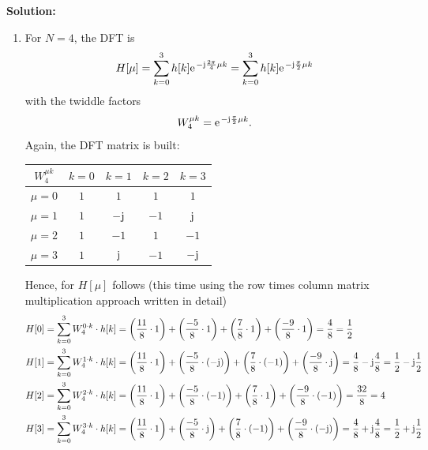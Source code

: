 \documentclass[11pt,a4paper,DIV=12]{scrartcl}
\begin{document}
\begin{Loesung}
\textbf{Solution:}
\begin{enumerate}[label=\alph*)]
	\item For $N=4$, the DFT is
	\begin{equation}
	H[\mu]=\sum_{k=0}^{3}h[k]\e^{-\im\frac{2\pi}{4}\mu k}=\sum_{k=0}^{3}h[k]\e^{-\im\frac{\pi}{2}\mu k}\nonumber
	\end{equation}
	with the twiddle factors
	\begin{equation}
	W_4^{\mu k}=\e^{-\im\frac{\pi}{2}\mu k}\nonumber.
	\end{equation}
	Again, the DFT matrix is built:
	\begin{center}
		\begin{tabular}{|c|c|c|c|c|}
		\hline
		$W_4^{\mu k}$ & $k=0$ & $k=1$ & $k=2$ & $k=3$\\\hline
		$\mu=0$ & $1$ & $1$ & $1$ & $1$\\\hline
		$\mu=1$ & $1$ & $-\im$ & $-1$ & $\im$\\\hline
		$\mu=2$ & $1$ & $-1$ & $1$ & $-1$\\\hline
		$\mu=3$ & $1$ & $\im$ & $-1$ & $-\im$\\\hline
		\end{tabular}
	\end{center}
	Hence, for $H[\mu]$ follows (this time using the row times column matrix
	multiplication approach written in detail)
	\begin{align}
	H[0]&=\sum_{k=0}^{3} W_4^{0\cdot k} \cdot h[k]=\left(\frac{11}{8}\cdot1\right)+\left(\frac{-5}{8}\cdot1\right)+\left(\frac{7}{8}\cdot1\right)+\left(\frac{-9}{8}\cdot1\right)=\frac{4}{8}=\frac{1}{2}\nonumber\\
	H[1]&=\sum_{k=0}^{3} W_4^{1\cdot k} \cdot h[k]=\left(\frac{11}{8}\cdot1\right)+\left(\frac{-5}{8}\cdot(-\im)\right)+\left(\frac{7}{8}\cdot(-1)\right)+\left(\frac{-9}{8}\cdot\im\right)=\frac{4}{8}-\im\frac{4}{8}=\frac{1}{2}-\im\frac{1}{2}\nonumber\\
	H[2]&=\sum_{k=0}^{3} W_4^{2\cdot k} \cdot h[k]=\left(\frac{11}{8}\cdot1\right)+\left(\frac{-5}{8}\cdot(-1)\right)+\left(\frac{7}{8}\cdot1\right)+\left(\frac{-9}{8}\cdot(-1)\right)=\frac{32}{8}=4\nonumber\\
	H[3]&=\sum_{k=0}^{3} W_4^{3\cdot k} \cdot h[k]=\left(\frac{11}{8}\cdot1\right)+\left(\frac{-5}{8}\cdot\im\right)+\left(\frac{7}{8}\cdot(-1)\right)+\left(\frac{-9}{8}\cdot(-\im)\right)=\frac{4}{8}+\im\frac{4}{8}=\frac{1}{2}+\im\frac{1}{2}\nonumber
	\end{align}

\end{enumerate}
\end{Loesung}
\end{document}
